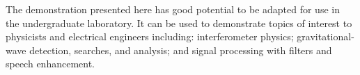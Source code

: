 \documentclass[paper-main.tex]{subfiles}
\begin{document}
The demonstration presented here has good potential to be adapted for use in the undergraduate laboratory. 
It can be used to demonstrate topics of interest to physicists and electrical engineers including: interferometer physics; gravitational-wave detection, searches, and analysis; and signal processing with filters and speech enhancement. 
\end{document}
